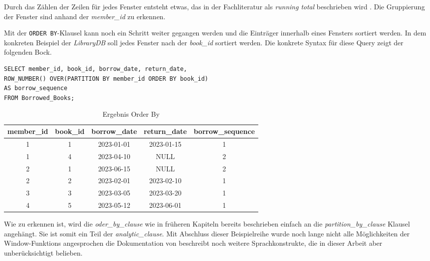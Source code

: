 Durch das Zählen der Zeilen für jedes Fenster entsteht etwas, das in der Fachliteratur
als \textit{running total} beschrieben wird \citep{Nuijten2023}. Die Gruppierung
der Fenster sind anhand der \textit{member\_id} zu erkennen.

Mit der \texttt{ORDER BY}-Klausel kann noch ein Schritt weiter gegangen werden
und die Einträger innerhalb eines Fensters sortiert werden. In dem konkreten Beispiel
der \textit{LibraryDB} soll jedes Fenster nach der \textit{book\_id} sortiert werden.
Die konkrete Syntax für diese Query zeigt der folgenden Bock.

\begin{lstlisting}
SELECT member_id, book_id, borrow_date, return_date,
ROW_NUMBER() OVER(PARTITION BY member_id ORDER BY book_id)
AS borrow_sequence
FROM Borrowed_Books;
\end{lstlisting}
\begin{table}[h]
	\centering
	\begin{tabular}{|c|c|c|c|c|}
		\hline
		\textbf{member\_id} & \textbf{book\_id} & \textbf{borrow\_date} & \textbf{return\_date} & \textbf{borrow\_sequence} \\
		\hline
		1                   & 1                 & 2023-01-01            & 2023-01-15            & 1                         \\
		\hline
		1                   & 4                 & 2023-04-10            & NULL                  & 2                         \\
		\hline
		2                   & 1                 & 2023-06-15            & NULL                  & 2                         \\
		\hline
		2                   & 2                 & 2023-02-01            & 2023-02-10            & 1                         \\
		\hline
		3                   & 3                 & 2023-03-05            & 2023-03-20            & 1                         \\
		\hline
		4                   & 5                 & 2023-05-12            & 2023-06-01            & 1                         \\
		\hline
	\end{tabular}
	\caption{Ergebnis Order By}
	\label{tab:ergebnis_oder_by}
\end{table}

Wie zu erkennen ist, wird die \textit{oder\_by\_clause} wie in früheren Kapiteln
bereits beschrieben einfach an die \textit{partition\_by\_clause} Klausel
angehängt. Sie ist somit ein Teil der \textit{analytic\_clause}. Mit Abschluss dieser
Beispielreihe wurde noch lange nicht alle Möglichkeiten der Window-Funktions angesprochen
die Dokumentation von \citet{oracle} beschreibt noch weitere Sprachkonstrukte, die
in dieser Arbeit aber unberücksichtigt belieben.

